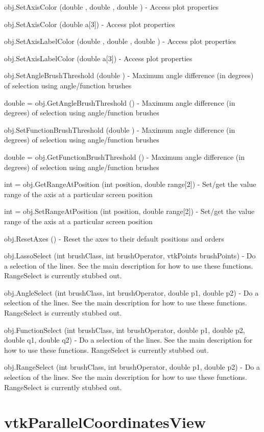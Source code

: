 \begin{DoxyItemize}
\item {\ttfamily obj.\-Set\-Axis\-Color (double , double , double )} -\/ Access plot properties  
\item {\ttfamily obj.\-Set\-Axis\-Color (double a\mbox{[}3\mbox{]})} -\/ Access plot properties  
\item {\ttfamily obj.\-Set\-Axis\-Label\-Color (double , double , double )} -\/ Access plot properties  
\item {\ttfamily obj.\-Set\-Axis\-Label\-Color (double a\mbox{[}3\mbox{]})} -\/ Access plot properties  
\item {\ttfamily obj.\-Set\-Angle\-Brush\-Threshold (double )} -\/ Maximum angle difference (in degrees) of selection using angle/function brushes  
\item {\ttfamily double = obj.\-Get\-Angle\-Brush\-Threshold ()} -\/ Maximum angle difference (in degrees) of selection using angle/function brushes  
\item {\ttfamily obj.\-Set\-Function\-Brush\-Threshold (double )} -\/ Maximum angle difference (in degrees) of selection using angle/function brushes  
\item {\ttfamily double = obj.\-Get\-Function\-Brush\-Threshold ()} -\/ Maximum angle difference (in degrees) of selection using angle/function brushes  
\item {\ttfamily int = obj.\-Get\-Range\-At\-Position (int position, double range\mbox{[}2\mbox{]})} -\/ Set/get the value range of the axis at a particular screen position  
\item {\ttfamily int = obj.\-Set\-Range\-At\-Position (int position, double range\mbox{[}2\mbox{]})} -\/ Set/get the value range of the axis at a particular screen position  
\item {\ttfamily obj.\-Reset\-Axes ()} -\/ Reset the axes to their default positions and orders  
\item {\ttfamily obj.\-Lasso\-Select (int brush\-Class, int brush\-Operator, vtk\-Points brush\-Points)} -\/ Do a selection of the lines. See the main description for how to use these functions. Range\-Select is currently stubbed out.  
\item {\ttfamily obj.\-Angle\-Select (int brush\-Class, int brush\-Operator, double p1, double p2)} -\/ Do a selection of the lines. See the main description for how to use these functions. Range\-Select is currently stubbed out.  
\item {\ttfamily obj.\-Function\-Select (int brush\-Class, int brush\-Operator, double p1, double p2, double q1, double q2)} -\/ Do a selection of the lines. See the main description for how to use these functions. Range\-Select is currently stubbed out.  
\item {\ttfamily obj.\-Range\-Select (int brush\-Class, int brush\-Operator, double p1, double p2)} -\/ Do a selection of the lines. See the main description for how to use these functions. Range\-Select is currently stubbed out.  
\end{DoxyItemize}\hypertarget{vtkviews_vtkparallelcoordinatesview}{}\section{vtk\-Parallel\-Coordinates\-View}\label{vtkviews_vtkparallelcoordinatesview}
